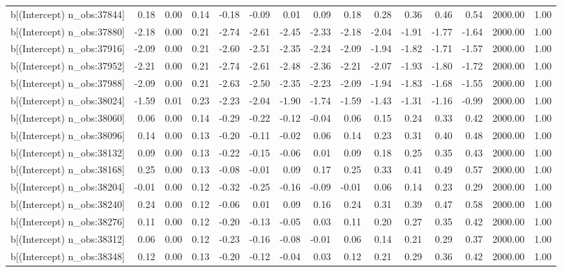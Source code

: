 \begin{table}[ht]
\begin{tabular}{rrrrrrrrrrrrrrr}
  b[(Intercept) n\_obs:37844] & 0.18 & 0.00 & 0.14 & -0.18 & -0.09 & 0.01 & 0.09 & 0.18 & 0.28 & 0.36 & 0.46 & 0.54 & 2000.00 & 1.00 \\ 
  b[(Intercept) n\_obs:37880] & -2.18 & 0.00 & 0.21 & -2.74 & -2.61 & -2.45 & -2.33 & -2.18 & -2.04 & -1.91 & -1.77 & -1.64 & 2000.00 & 1.00 \\ 
  b[(Intercept) n\_obs:37916] & -2.09 & 0.00 & 0.21 & -2.60 & -2.51 & -2.35 & -2.24 & -2.09 & -1.94 & -1.82 & -1.71 & -1.57 & 2000.00 & 1.00 \\ 
  b[(Intercept) n\_obs:37952] & -2.21 & 0.00 & 0.21 & -2.74 & -2.61 & -2.48 & -2.36 & -2.21 & -2.07 & -1.93 & -1.80 & -1.72 & 2000.00 & 1.00 \\ 
  b[(Intercept) n\_obs:37988] & -2.09 & 0.00 & 0.21 & -2.63 & -2.50 & -2.35 & -2.23 & -2.09 & -1.94 & -1.83 & -1.68 & -1.55 & 2000.00 & 1.00 \\ 
  b[(Intercept) n\_obs:38024] & -1.59 & 0.01 & 0.23 & -2.23 & -2.04 & -1.90 & -1.74 & -1.59 & -1.43 & -1.31 & -1.16 & -0.99 & 2000.00 & 1.00 \\ 
  b[(Intercept) n\_obs:38060] & 0.06 & 0.00 & 0.14 & -0.29 & -0.22 & -0.12 & -0.04 & 0.06 & 0.15 & 0.24 & 0.33 & 0.42 & 2000.00 & 1.00 \\ 
  b[(Intercept) n\_obs:38096] & 0.14 & 0.00 & 0.13 & -0.20 & -0.11 & -0.02 & 0.06 & 0.14 & 0.23 & 0.31 & 0.40 & 0.48 & 2000.00 & 1.00 \\ 
  b[(Intercept) n\_obs:38132] & 0.09 & 0.00 & 0.13 & -0.22 & -0.15 & -0.06 & 0.01 & 0.09 & 0.18 & 0.25 & 0.35 & 0.43 & 2000.00 & 1.00 \\ 
  b[(Intercept) n\_obs:38168] & 0.25 & 0.00 & 0.13 & -0.08 & -0.01 & 0.09 & 0.17 & 0.25 & 0.33 & 0.41 & 0.49 & 0.57 & 2000.00 & 1.00 \\ 
  b[(Intercept) n\_obs:38204] & -0.01 & 0.00 & 0.12 & -0.32 & -0.25 & -0.16 & -0.09 & -0.01 & 0.06 & 0.14 & 0.23 & 0.29 & 2000.00 & 1.00 \\ 
  b[(Intercept) n\_obs:38240] & 0.24 & 0.00 & 0.12 & -0.06 & 0.01 & 0.09 & 0.16 & 0.24 & 0.31 & 0.39 & 0.47 & 0.58 & 2000.00 & 1.00 \\ 
  b[(Intercept) n\_obs:38276] & 0.11 & 0.00 & 0.12 & -0.20 & -0.13 & -0.05 & 0.03 & 0.11 & 0.20 & 0.27 & 0.35 & 0.42 & 2000.00 & 1.00 \\ 
  b[(Intercept) n\_obs:38312] & 0.06 & 0.00 & 0.12 & -0.23 & -0.16 & -0.08 & -0.01 & 0.06 & 0.14 & 0.21 & 0.29 & 0.37 & 2000.00 & 1.00 \\ 
  b[(Intercept) n\_obs:38348] & 0.12 & 0.00 & 0.13 & -0.20 & -0.12 & -0.04 & 0.03 & 0.12 & 0.21 & 0.29 & 0.36 & 0.42 & 2000.00 & 1.00 \\ 

\end{tabular}
\end{table}
